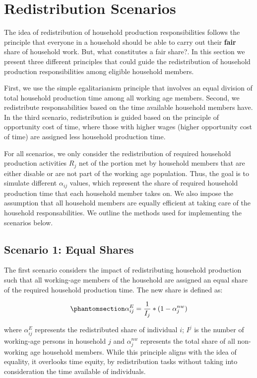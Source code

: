 \documentclass[
  11pt,
]{article}
\begin{document}
\section{Redistribution Scenarios}\label{redistribution-scenarios}

The idea of redistribution of household production responsibilities
follows the principle that everyone in a household should be able to
carry out their \textbf{fair} share of household work. But, what
constitutes a fair share?. In this section we present three different
principles that could guide the redistribution of household production
responsibilities among eligible household members.

First, we use the simple egalitarianism principle that involves an equal
division of total household production time among all working age
members. Second, we redistribute responsabilities based on the time
available household members have. In the third scenario, redistribution
is guided based on the principle of opportunity cost of time, where
those with higher wages (higher opportunity cost of time) are assigned
less household production time.

For all scenarios, we only consider the redistribution of required
household production activities \(R_j\) net of the portion met by
household members that are either disable or are not part of the working
age population. Thus, the goal is to simulate different \(\alpha_{ij}\)
values, which represent the share of required household production time
that each household member takes on. We also impose the assumption that
all household members are equally efficient at taking care of the
household responsabilities. We outline the methods used for implementing
the scenarios below.

\subsection{Scenario 1: Equal Shares}\label{scenario-1-equal-shares}

The first scenario considers the impact of redistributing household
production such that all working-age members of the household are
assigned an equal share of the required household production time. The
new share is defined as:

\begin{equation}\phantomsection\label{eq-r1}{\alpha_{ij}^E= \frac{1}{I_j}*(1-\alpha_{j}^{nw})
}\end{equation}

where \(\alpha_{ij}^E\) represents the redistributed share of individual
\(i\); \(I^j\) is the number of working-age persons in household \(j\)
and \(\alpha_{j}^{nw}\) represents the total share of all non-working
age household members. While this principle aligns with the idea of
equality, it overlooks time equity, by redistribution tasks without
taking into consideration the time available of individuals.
\end{document}
